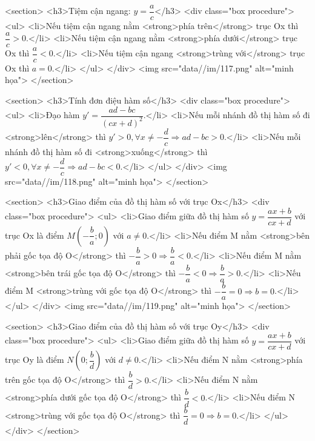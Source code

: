     <section>
        <h3>Tiệm cận ngang: \(y = \dfrac{a}{c}\)</h3>
        <div class="box procedure">
            <ul>
                <li>Nếu tiệm cận ngang nằm <strong>phía trên</strong> trục Ox thì \(\dfrac{a}{c} > 0\).</li>
                <li>Nếu tiệm cận ngang nằm <strong>phía dưới</strong> trục Ox thì \(\dfrac{a}{c} < 0\).</li>
                <li>Nếu tiệm cận ngang <strong>trùng với</strong> trục Ox thì \(a=0\).</li>
            </ul>
        </div>
        <img src="data//im/117.png" alt="minh họa">
    </section>

    <section>
        <h3>Tính đơn điệu hàm số</h3>
        <div class="box procedure">
            <ul>
                <li>Đạo hàm \(y' = \dfrac{ad-bc}{(cx+d)^2}\).</li>
                <li>Nếu mỗi nhánh đồ thị hàm số đi <strong>lên</strong> thì \(y' > 0, \forall x \ne -\dfrac{d}{c} \Rightarrow \boxed{ad-bc > 0}\).</li>
                <li>Nếu mỗi nhánh đồ thị hàm số đi <strong>xuống</strong> thì \(y' < 0, \forall x \ne -\dfrac{d}{c} \Rightarrow \boxed{ad-bc < 0}\).</li>
            </ul>
        </div>
        <img src="data//im/118.png" alt="minh họa">
    </section>

    <section>
        <h3>Giao điểm của đồ thị hàm số với trục Ox</h3>
        <div class="box procedure">
            <ul>
                <li>Giao điểm giữa đồ thị hàm số \(y = \dfrac{ax+b}{cx+d}\) với trục Ox là điểm \(M\left(-\dfrac{b}{a}; 0\right)\) với \(a \ne 0\).</li>
                <li>Nếu điểm M nằm <strong>bên phải gốc tọa độ O</strong> thì \(-\dfrac{b}{a} > 0 \Rightarrow \dfrac{b}{a} < 0\).</li>
                <li>Nếu điểm M nằm <strong>bên trái gốc tọa độ O</strong> thì \(-\dfrac{b}{a} < 0 \Rightarrow \dfrac{b}{a} > 0\).</li>
                <li>Nếu điểm M <strong>trùng với gốc tọa độ O</strong> thì \(-\dfrac{b}{a} = 0 \Rightarrow b = 0\).</li>
            </ul>
        </div>
        <img src="data//im/119.png" alt="minh họa">
    </section>

    <section>
        <h3>Giao điểm của đồ thị hàm số với trục Oy</h3>
        <div class="box procedure">
            <ul>
                <li>Giao điểm giữa đồ thị hàm số \(y = \dfrac{ax+b}{cx+d}\) với trục Oy là điểm \(N\left(0; \dfrac{b}{d}\right)\) với \(d \ne 0\).</li>
                <li>Nếu điểm N nằm <strong>phía trên gốc tọa độ O</strong> thì \(\dfrac{b}{d} > 0\).</li>
                <li>Nếu điểm N nằm <strong>phía dưới gốc tọa độ O</strong> thì \(\dfrac{b}{d} < 0\).</li>
                <li>Nếu điểm N <strong>trùng với gốc tọa độ O</strong> thì \(\dfrac{b}{d} = 0 \Rightarrow b = 0\).</li>
            </ul>
        </div>
    </section>

